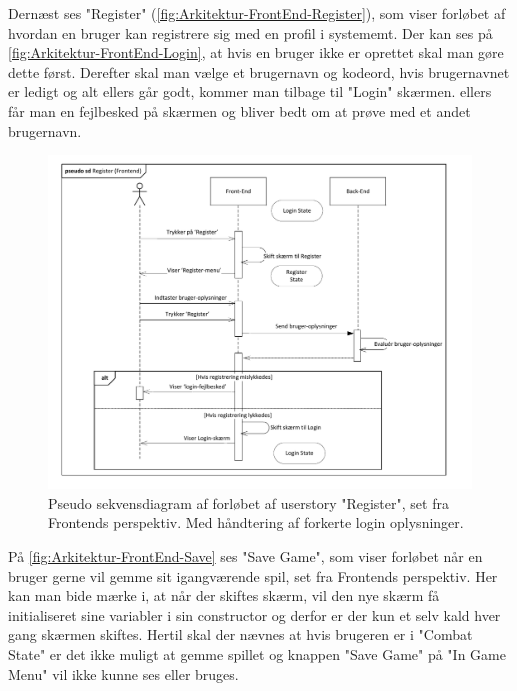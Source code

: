 \noindent Dernæst ses "Register" (\autoref{fig:Arkitektur-FrontEnd-Register}), som viser forløbet af hvordan en bruger kan registrere sig med en profil i systememt. Der kan ses på \autoref{fig:Arkitektur-FrontEnd-Login}, at hvis en bruger ikke er oprettet skal man gøre dette først. Derefter skal man vælge et brugernavn og kodeord, hvis brugernavnet er ledigt og alt ellers går godt, kommer man tilbage til "Login" skærmen. ellers får man en fejlbesked på skærmen og bliver bedt om at prøve med et andet brugernavn.\\

\begin{figure}[H]
\centering
\includegraphics[width = \textwidth]{02-Body/Images/Front-End_-_Arkitektur-register.pdf}
\caption{Pseudo sekvensdiagram af forløbet af userstory "Register", set fra Frontends perspektiv. Med håndtering af forkerte login oplysninger.}
\label{fig:Arkitektur-FrontEnd-Register}
\end{figure}

\noindent På \autoref{fig:Arkitektur-FrontEnd-Save} ses "Save Game", som viser forløbet når en bruger gerne vil gemme sit igangværende spil, set fra Frontends perspektiv. Her kan man bide mærke i, at når der skiftes skærm, vil den nye skærm få initialiseret sine variabler i sin constructor og derfor er der kun et selv kald hver gang skærmen skiftes.
Hertil skal der nævnes at hvis brugeren er i "Combat State" er det ikke muligt at gemme spillet og knappen "Save Game" på "In Game Menu" vil ikke kunne ses eller bruges.\\

